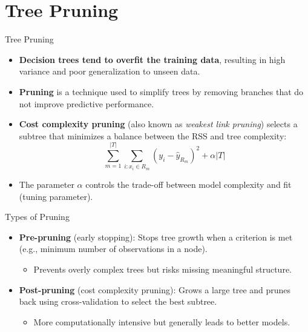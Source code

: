 \documentclass[aspectratio=169,xcolor=dvipsnames]{beamer}
\begin{document}
\section{Tree Pruning}
\begin{frame}{Tree Pruning}
    \begin{itemize}
        \item \textbf{Decision trees tend to overfit the training data}, resulting in high variance and poor generalization to unseen data.
        \item \textbf{Pruning} is a technique used to simplify trees by removing branches that do not improve predictive performance.
        \item \textbf{Cost complexity pruning} (also known as \textit{weakest link pruning}) selects a subtree that minimizes a balance between the RSS and tree complexity:
        \begin{equation}
            \sum_{m=1}^{|T|} \sum_{i: x_i \in R_m} (y_i - \hat{y}_{R_m})^2 + \alpha |T|
        \end{equation}
        \item The parameter \( \alpha \) controls the trade-off between model complexity and fit (tuning parameter).
    \end{itemize}
\end{frame}

\begin{frame}{Types of Pruning}
    \begin{itemize}
    \setlength\itemsep{1cm}
        \item \textbf{Pre-pruning} (early stopping): Stops tree growth when a criterion is met (e.g., minimum number of observations in a node).
        \begin{itemize}
            \item Prevents overly complex trees but risks missing meaningful structure.
        \end{itemize}
        \item \textbf{Post-pruning} (cost complexity pruning): Grows a large tree and prunes back using cross-validation to select the best subtree.
        \begin{itemize}
            \item More computationally intensive but generally leads to better models.
        \end{itemize}
    \end{itemize}
\end{frame}
\end{document}
